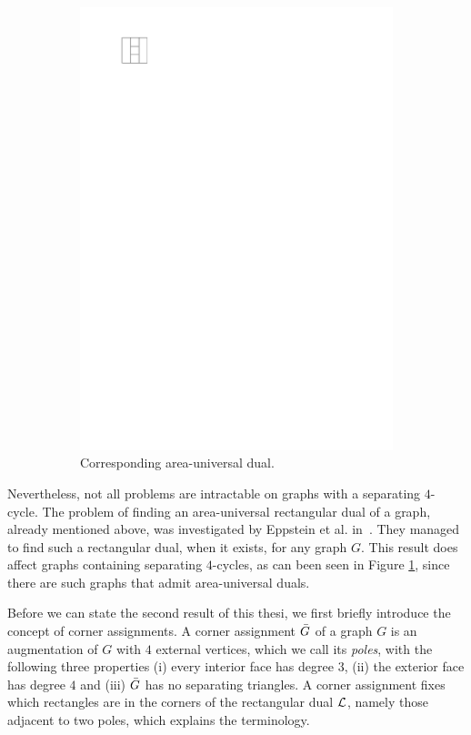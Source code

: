\begin{figure}
\begin{subfigure}[b]{3cm}
        \includegraphics[scale=1]{introduction/img/areaunivDual.pdf}
        \caption{Corresponding area-universal dual.}
      \end{subfigure}
    \caption{}
    \label{fig:intro:areauniv}
  \end{figure}

  Nevertheless, not all problems are intractable on graphs with a separating $4$-cycle. The problem of finding an area-universal rectangular dual of a graph, already mentioned above, was investigated by Eppstein et al. in~\cite{Eppstein2012}. They managed to find such a rectangular dual, when it exists, for any graph $G$. This result does affect graphs containing separating $4$-cycles, as can been seen in Figure \ref{fig:intro:areauniv}, since there are such graphs that admit area-universal duals.

  Before we can state the second result of this thesi, we first briefly introduce the concept of corner assignments.
  A corner assignment $\bar{G}$ of a graph $G$ is an augmentation of $G$ with $4$ external vertices, which we call its \emph{poles}, with the following three properties (i) every interior face has degree $3$, (ii) the exterior face has degree $4$ and (iii) $\bar{G}$ has no separating triangles.
  A corner assignment fixes which rectangles are in the corners of the rectangular dual $\mathcal{L}$, namely those adjacent to two poles, which explains the terminology.

